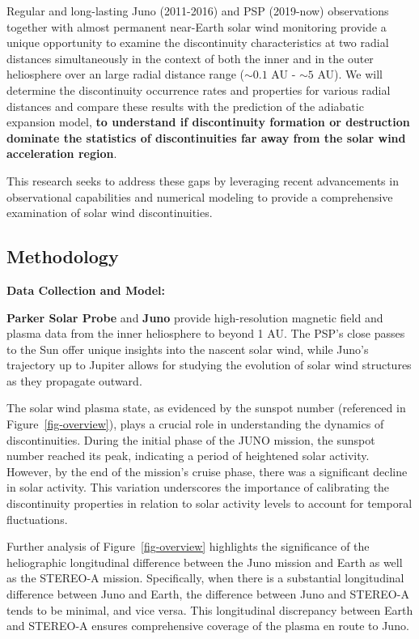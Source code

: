 \documentclass[
  letterpaper,
  DIV=11,
  numbers=noendperiod]{scrartcl}
\begin{document}
Regular and long-lasting Juno (2011-2016) and PSP (2019-now) observations together with almost permanent near-Earth solar wind monitoring provide a unique opportunity to examine the discontinuity characteristics at two radial distances simultaneously in the context of both the inner and in the outer heliosphere over an large radial distance range (\(\sim 0.1\) AU - \(\sim 5\) AU). We will determine the discontinuity occurrence rates and properties for various radial distances and compare these results with the prediction of the adiabatic expansion model, \textbf{to understand if discontinuity formation or destruction dominate the statistics of discontinuities far away from the solar wind acceleration region}.

This research seeks to address these gaps by leveraging recent advancements in observational capabilities and numerical modeling to provide a comprehensive examination of solar wind discontinuities.

\subsection{Methodology}\label{methodology}

\textbf{Data Collection and Model:}

\textbf{Parker Solar Probe} and \textbf{Juno} provide high-resolution magnetic field and plasma data from the inner heliosphere to beyond 1 AU. The PSP's close passes to the Sun offer unique insights into the nascent solar wind, while Juno's trajectory up to Jupiter allows for studying the evolution of solar wind structures as they propagate outward.

The solar wind plasma state, as evidenced by the sunspot number (referenced in Figure~\ref{fig-overview}), plays a crucial role in understanding the dynamics of discontinuities. During the initial phase of the JUNO mission, the sunspot number reached its peak, indicating a period of heightened solar activity. However, by the end of the mission's cruise phase, there was a significant decline in solar activity. This variation underscores the importance of calibrating the discontinuity properties in relation to solar activity levels to account for temporal fluctuations.

Further analysis of Figure~\ref{fig-overview} highlights the significance of the heliographic longitudinal difference between the Juno mission and Earth as well as the STEREO-A mission. Specifically, when there is a substantial longitudinal difference between Juno and Earth, the difference between Juno and STEREO-A tends to be minimal, and vice versa. This longitudinal discrepancy between Earth and STEREO-A ensures comprehensive coverage of the plasma en route to Juno.
\end{document}
